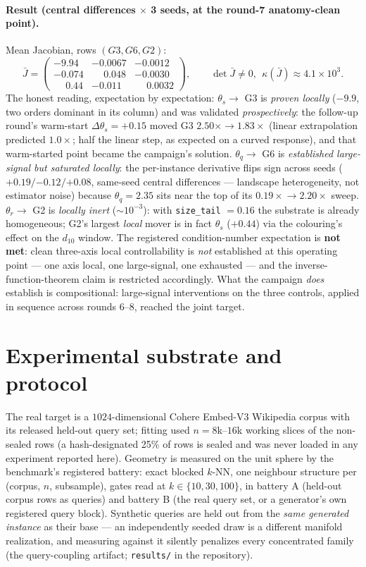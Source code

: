 \documentclass[11pt]{article}
\begin{document}
\paragraph{Result (central differences $\times$ 3 seeds, at the round-7
anatomy-clean point).} Mean Jacobian, rows $(G3, G6, G2)$:
\[
\bar J = \begin{pmatrix}
-9.94 & -0.0067 & -0.0012\\
-0.074 & \phantom{-}0.048 & -0.0030\\
\phantom{-}0.44 & -0.011 & \phantom{-}0.0032
\end{pmatrix},
\qquad \det \bar J \neq 0,\ \ \kappa(\bar J) \approx 4.1\times10^{3}.
\]
The honest reading, expectation by expectation:
$\theta_s \to$ G3 is \emph{proven locally} ($-9.9$, two orders dominant in its
column) and was validated \emph{prospectively}: the follow-up round's
warm-start $\Delta\theta_s = +0.15$ moved G3 $2.50\times \to 1.83\times$
(linear extrapolation predicted $1.0\times$; half the linear step, as expected
on a curved response), and that warm-started point became the campaign's
solution. $\theta_q \to$ G6 is \emph{established large-signal but saturated
locally}: the per-instance derivative flips sign across seeds
($+0.19/{-0.12}/{+0.08}$, same-seed central differences --- landscape
heterogeneity, not estimator noise) because $\theta_q = 2.35$ sits near the
top of its $0.19\times\!\to\!2.20\times$ sweep. $\theta_r \to$ G2 is
\emph{locally inert} ($\sim\!10^{-3}$): with \texttt{size\_tail} $=0.16$ the
substrate is already homogeneous; G2's largest \emph{local} mover is in fact
$\theta_s$ ($+0.44$) via the colouring's effect on the $d_{10}$ window. The
registered condition-number expectation is \textbf{not met}: clean three-axis
local controllability is \emph{not} established at this operating point ---
one axis local, one large-signal, one exhausted --- and the
inverse-function-theorem claim is restricted accordingly. What the campaign
\emph{does} establish is compositional: large-signal interventions on the
three controls, applied in sequence across rounds 6--8, reached the joint
target.

\section{Experimental substrate and protocol}\label{sec:substrate}

The real target is a $1024$-dimensional Cohere Embed-V3 Wikipedia corpus with
its released held-out query set; fitting used $n = 8$k--$16$k working slices
of the non-sealed rows (a hash-designated 25\% of rows is sealed and was
never loaded in any experiment reported here). Geometry is measured on the
unit sphere by the benchmark's registered battery: exact blocked $k$-NN, one
neighbour structure per (corpus, $n$, subsample), gates read at
$k \in \{10, 30, 100\}$, in battery A (held-out corpus rows as queries) and
battery B (the real query set, or a generator's own registered query block).
Synthetic queries are held out from the \emph{same generated instance} as
their base --- an independently seeded draw is a different manifold
realization, and measuring against it silently penalizes every concentrated
family (the query-coupling artifact; \texttt{results/} in the repository).
\end{document}
